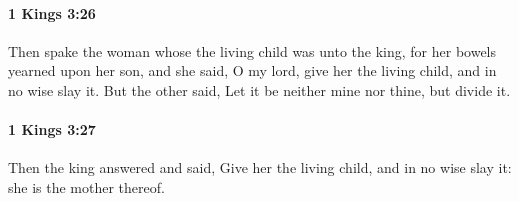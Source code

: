 		\paragraph{1 Kings 3:26} %
			\label{1KINGS-3-26}

			Then spake the woman whose the living child was unto the king, for her bowels yearned upon her son, and she said, O my lord, give her the living child, and in no wise slay it. But the other said, Let it be neither mine nor thine, but divide it.


		\paragraph{1 Kings 3:27} %
			\label{1KINGS-3-27}

			Then the king answered and said, Give her the living child, and in no wise slay it: she is the mother thereof.


